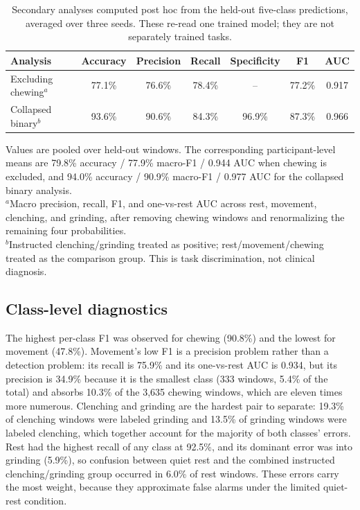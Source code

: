 \documentclass[pdflatex,sn-nature,iicol]{sn-jnl}
\begin{document}
\begin{table}[h]
  \caption{Secondary analyses computed post hoc from the held-out five-class predictions, averaged over three seeds. These re-read one trained model; they are not separately trained tasks.}
  \label{tab:sensitivity}
  \centering
  \begin{tabular}{lcccccc}
    \toprule
    Analysis & Accuracy & Precision & Recall & Specificity & F1 & AUC \\
    \midrule
    Excluding chewing$^{a}$ & 77.1\% & 76.6\% & 78.4\% & -- & 77.2\% & 0.917 \\
    Collapsed binary$^{b}$ & 93.6\% & 90.6\% & 84.3\% & 96.9\% & 87.3\% & 0.966 \\
    \bottomrule
  \end{tabular}
  \begin{flushleft}\footnotesize
  Values are pooled over held-out windows. The corresponding participant-level means are 79.8\% accuracy / 77.9\% macro-F1 / 0.944 AUC when chewing is excluded, and 94.0\% accuracy / 90.9\% macro-F1 / 0.977 AUC for the collapsed binary analysis.\\
  $^{a}$Macro precision, recall, F1, and one-vs-rest AUC across rest, movement, clenching, and grinding, after removing chewing windows and renormalizing the remaining four probabilities.\\
  $^{b}$Instructed clenching/grinding treated as positive; rest/movement/chewing treated as the comparison group. This is task discrimination, not clinical diagnosis.
  \end{flushleft}
\end{table}

\subsection{Class-level diagnostics}

The highest per-class F1 was observed for chewing (90.8\%) and the lowest for movement (47.8\%). Movement's low F1 is a precision problem rather than a detection problem: its recall is 75.9\% and its one-vs-rest AUC is 0.934, but its precision is 34.9\% because it is the smallest class (333 windows, 5.4\% of the total) and absorbs 10.3\% of the 3,635 chewing windows, which are eleven times more numerous. Clenching and grinding are the hardest pair to separate: 19.3\% of clenching windows were labeled grinding and 13.5\% of grinding windows were labeled clenching, which together account for the majority of both classes' errors. Rest had the highest recall of any class at 92.5\%, and its dominant error was into grinding (5.9\%), so confusion between quiet rest and the combined instructed clenching/grinding group occurred in 6.0\% of rest windows. These errors carry the most weight, because they approximate false alarms under the limited quiet-rest condition.
\end{document}
